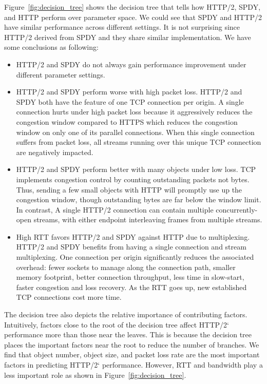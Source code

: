 Figure~\ref{fig:decision_tree} shows the decision tree that tells how HTTP/2, SPDY, and HTTP perform over parameter space. We could see that SPDY and HTTP/2 have similar performance across different settings. It is not surprising since HTTP/2 derived from SPDY and they share similar implementation. We have some conclusions as following:

\begin{itemize}
	\item{HTTP/2 and SPDY do not always gain performance improvement under different parameter settings. }
    \item{HTTP/2 and SPDY perform worse with high packet loss. HTTP/2 and SPDY both have the feature of one TCP connection per origin. A single connection hurts under high packet loss because it aggressively reduces the congestion window compared to HTTPS which reduces the congestion window on only one of its parallel connections. When this single connection suffers from packet loss, all streams running over this unique TCP connection are negatively impacted.}
    \item{HTTP/2 and SPDY perform better with many objects under low loss. TCP implements congestion control by counting outstanding packets not bytes. Thus, sending a few small objects with HTTP will promptly use up the congestion window, though outstanding bytes are far below the window limit. In contrast, A single HTTP/2 connection can contain multiple concurrently-open streams, with either endpoint interleaving frames from multiple streams.}
    \item{High RTT favors HTTP/2 and SPDY against HTTP due to multiplexing. HTTP/2 and SPDY benefits from having a single connection and stream multiplexing. One connection per origin significantly reduces the associated overhead: fewer sockets to manage along the connection path, smaller memory footprint, better connection throughput, less time in slow-start, faster congestion and loss recovery. As the RTT goes up, new established TCP connections cost more time.}
\end{itemize}


The decision tree also depicts the relative importance of contributing factors. Intuitively, factors close to the root of the decision tree affect HTTP/2‘ performance more than those near the leaves. This is because the decision tree places the important factors near the root to reduce the number of branches. We find that object number, object size, and packet loss rate are the most important factors in predicting HTTP/2‘ performance. However, RTT and bandwidth play a less important role as shown in Figure~\ref{fig:decision_tree}.





